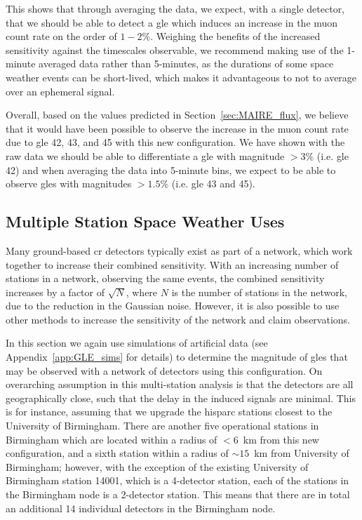 This shows that through averaging the data, we expect, with a single detector, that we should be able to detect a \gls{gle} which induces an increase in the muon count rate on the order of $1 - 2 \%$. Weighing the benefits of the increased sensitivity against the timescales observable, we recommend making use of the 1-minute averaged data rather than 5-minutes, as the durations of some space weather events can be short-lived, which makes it advantageous to not to average over an ephemeral signal.

Overall, based on the values predicted in Section~\ref{sec:MAIRE_flux}, we believe that it would have been possible to observe the increase in the muon count rate due to \gls{gle} 42, 43, and 45 with this new configuration. We have shown with the raw data we should be able to differentiate a \gls{gle} with magnitude $> 3\%$ (i.e. \gls{gle} 42) and when averaging the data into 5-minute bins, we expect to be able to observe \glspl{gle} with magnitudes $> 1.5 \%$  (i.e. \gls{gle} 43 and 45). 


\subsection{Multiple Station Space Weather Uses}\label{sec:HS_14008_multi_sims}


Many ground-based \gls{cr} detectors typically exist as part of a network, which work together to increase their combined sensitivity. With an increasing number of stations in a network, observing the same events, the combined sensitivity increases by a factor of $\sqrt{N}$, where $N$ is the number of stations in the network, due to the reduction in the Gaussian noise. However, it is also possible to use other methods to increase the sensitivity of the network and claim observations.

In this section we again use simulations of artificial data (see Appendix~\ref{app:GLE_sims} for details) to determine the magnitude of \glspl{gle} that may be observed with a network of detectors using this configuration. On overarching assumption in this multi-station analysis is that the detectors are all geographically close, such that the delay in the induced signals are minimal. This is for instance, assuming that we upgrade the \gls{hisparc} stations closest to the University of Birmingham. There are another five operational stations in Birmingham which are located within a radius of $<6$~km from this new configuration, and a sixth station within a radius of $\sim 15$~km from University of Birmingham; however, with the exception of the existing University of Birmingham station 14001, which is a 4-detector station, each of the stations in the Birmingham node is a 2-detector station. This means that there are in total an additional 14 individual detectors in the Birmingham node.



